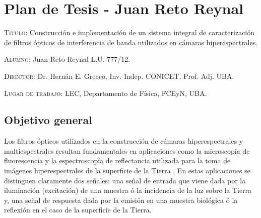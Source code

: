 \documentclass{ctuthesis}
\begin{document}
\maketitle
\renewcommand{\chaptername}{Capítulo}
\renewcommand{\figurename}{Figura}
\chapter*{Plan de Tesis - Juan Reto Reynal}


\textsc{Título:} Construcción e implementación de un sistema integral de 
caracterización de filtros ópticos de interferencia de banda utilizados en 
cámaras 
hiperespectrales.


\hspace{-0.4cm}\textsc{Alumno:} Juan Reto Reynal L.U. 777/12.

\hspace{-0.4cm}\textsc{Director:} Dr. Hernán E. Grecco, Inv. Indep. CONICET, 
Prof. Adj. UBA.

\hspace{-0.4cm}\textsc{Lugar de trabajo:} LEC, Departamento de Física, FCEyN, UBA.


\section*{Objetivo general}

\hspace{0.5cm} Los filtros ópticos utilizados en la construcción de cámaras 
hiperespectrales y 
multiespectrales resultan fundamentales en aplicaciones como la microscopía de 
fluorescencia \cite{Grecco2016} y la espectroscopía de reflectancia 
utilizada para la toma de 
imágenes hiperespectrales de la superficie de la Tierra \cite{Hogg2008}. En 
estas aplicaciones 
se distinguen claramente dos señales: una señal de entrada que viene dada por 
la iluminación (excitación) de una muestra ó la incidencia de la luz sobre la 
Tierra y, una señal de respuesta dada por la emisión en una muestra 
biológica ó la reflexión en el caso de la superficie de la Tierra.
\end{document}
